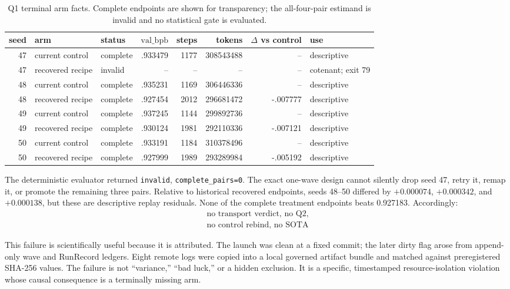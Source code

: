 \documentclass{article}
\newcommand{\valbpb}{\mathrm{val\_bpb}}
\begin{document}
\begin{table}[t]
\caption{Q1 terminal arm facts.  Complete endpoints are shown for
transparency; the all-four-pair estimand is invalid and no statistical gate is
evaluated.}
\label{tab:q1}
\centering\small
\begin{tabular}{rllrrrrl}
\toprule
seed & arm & status & $\valbpb$ & steps & tokens & $\Delta$ vs control & use\\
\midrule
47 & current control & complete & .933479 & 1177 & 308543488 & -- & descriptive\\
47 & recovered recipe & invalid & -- & -- & -- & -- & cotenant; exit 79\\
48 & current control & complete & .935231 & 1169 & 306446336 & -- & descriptive\\
48 & recovered recipe & complete & .927454 & 2012 & 296681472 & -.007777 & descriptive\\
49 & current control & complete & .937245 & 1144 & 299892736 & -- & descriptive\\
49 & recovered recipe & complete & .930124 & 1981 & 292110336 & -.007121 & descriptive\\
50 & current control & complete & .933191 & 1184 & 310378496 & -- & descriptive\\
50 & recovered recipe & complete & .927999 & 1989 & 293289984 & -.005192 & descriptive\\
\bottomrule
\end{tabular}
\end{table}

The deterministic evaluator returned \texttt{invalid},
\texttt{complete\_pairs=0}.  The exact one-wave design cannot silently drop
seed 47, retry it, remap it, or promote the remaining three pairs.  Relative
to historical recovered endpoints, seeds 48--50 differed by
$+0.000074$, $+0.000342$, and $+0.000138$, but these are descriptive replay
residuals.  None of the complete treatment endpoints beats 0.927183.
Accordingly:
\[
\boxed{\begin{gathered}
\text{no transport verdict, no Q2,}\\
\text{no control rebind, no SOTA}
\end{gathered}}
\]

This failure is scientifically useful because it is attributed.  The launch
was clean at a fixed commit; the later dirty flag arose from append-only wave
and RunRecord ledgers.  Eight remote logs were copied into a local governed
artifact bundle and matched against preregistered SHA-256 values.  The
failure is not ``variance,'' ``bad luck,'' or a hidden exclusion.  It is a
specific, timestamped resource-isolation violation whose causal consequence
is a terminally missing arm.
\end{document}

